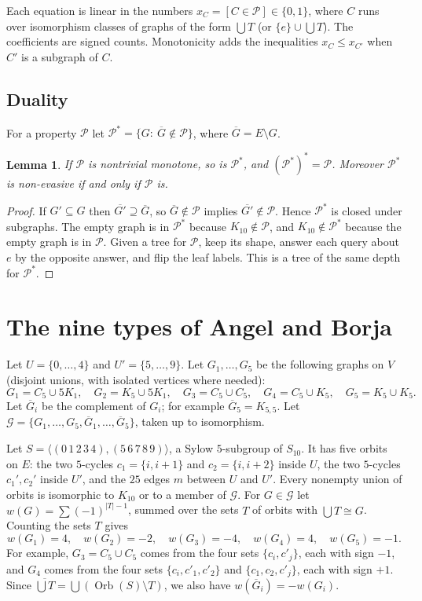 \documentclass[11pt]{article}
\theoremstyle{plain}
\newtheorem{lemma}[theorem]{Lemma}
\theoremstyle{definition}
\theoremstyle{remark}
\newcommand{\PP}{\mathcal P}
\newcommand{\Orb}{\operatorname{Orb}}
\begin{document}
Each equation is linear in the numbers $x_C=[C\in\PP]\in\{0,1\}$, where $C$ runs over isomorphism classes of graphs of the form $\bigcup T$ (or $\{e\}\cup\bigcup T$).
The coefficients are signed counts.
Monotonicity adds the inequalities $x_C\le x_{C'}$ when $C'$ is a subgraph of $C$.

\subsection{Duality}

For a property $\PP$ let $\PP^*=\{G:\ \overline G\notin\PP\}$, where $\overline G=E\setminus G$.

\begin{lemma}\label{lem:dual}
If $\PP$ is nontrivial monotone, so is $\PP^*$, and $(\PP^*)^*=\PP$.
Moreover $\PP^*$ is non-evasive if and only if $\PP$ is.
\end{lemma}

\begin{proof}
If $G'\subseteq G$ then $\overline{G'}\supseteq\overline G$, so $\overline{G}\notin\PP$ implies $\overline{G'}\notin\PP$.
Hence $\PP^*$ is closed under subgraphs.
The empty graph is in $\PP^*$ because $K_{10}\notin\PP$, and $K_{10}\notin\PP^*$ because the empty graph is in $\PP$.
Given a tree for $\PP$, keep its shape, answer each query about $e$ by the opposite answer, and flip the leaf labels.
This is a tree of the same depth for $\PP^*$.
\end{proof}

\section{The nine types of Angel and Borja}\label{sec:types}

Let $U=\{0,\dots,4\}$ and $U'=\{5,\dots,9\}$.
Let $G_1,\dots,G_5$ be the following graphs on $V$ (disjoint unions, with isolated vertices where needed):
\[
G_1=C_5\cup5K_1,\quad G_2=K_5\cup5K_1,\quad G_3=C_5\cup C_5,\quad G_4=C_5\cup K_5,\quad G_5=K_5\cup K_5 .
\]
Let $\overline{G}_i$ be the complement of $G_i$; for example $\overline G_5=K_{5,5}$.
Let $\mathcal G=\{G_1,\dots,G_5,\overline G_1,\dots,\overline G_5\}$, taken up to isomorphism.

Let $S=\langle(0\,1\,2\,3\,4),(5\,6\,7\,8\,9)\rangle$, a Sylow $5$-subgroup of $S_{10}$.
It has five orbits on $E$: the two $5$-cycles $c_1=\{i,i+1\}$ and $c_2=\{i,i+2\}$ inside $U$, the two $5$-cycles $c_1',c_2'$ inside $U'$, and the $25$ edges $m$ between $U$ and $U'$.
Every nonempty union of orbits is isomorphic to $K_{10}$ or to a member of $\mathcal G$.
For $G\in\mathcal G$ let $w(G)=\sum(-1)^{|T|-1}$, summed over the sets $T$ of orbits with $\bigcup T\cong G$.
Counting the sets $T$ gives
\[
w(G_1)=4,\quad w(G_2)=-2,\quad w(G_3)=-4,\quad w(G_4)=4,\quad w(G_5)=-1 .
\]
For example, $G_3=C_5\cup C_5$ comes from the four sets $\{c_i,c'_j\}$, each with sign $-1$, and $G_4$ comes from the four sets $\{c_i,c'_1,c'_2\}$ and $\{c_1,c_2,c'_j\}$, each with sign $+1$.
Since $\overline{\bigcup T}=\bigcup(\Orb(S)\setminus T)$, we also have $w(\overline G_i)=-w(G_i)$.
\end{document}
